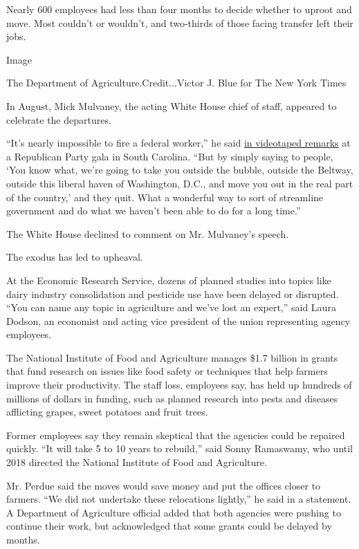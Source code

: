 Nearly 600 employees had less than four months to decide whether to
uproot and move. Most couldn't or wouldn't, and two-thirds of those
facing transfer left their jobs.

Image

The Department of Agriculture.Credit...Victor J. Blue for The New York
Times

In August, Mick Mulvaney, the acting White House chief of staff,
appeared to celebrate the departures.

``It's nearly impossible to fire a federal worker,'' he said
\href{https://www.washingtonpost.com/science/2019/08/05/usda-science-agencies-relocation-may-have-violated-law-inspector-general-report-says/}{in
videotaped remarks} at a Republican Party gala in South Carolina. ``But
by simply saying to people, `You know what, we're going to take you
outside the bubble, outside the Beltway, outside this liberal haven of
Washington, D.C., and move you out in the real part of the country,' and
they quit. What a wonderful way to sort of streamline government and do
what we haven't been able to do for a long time.''

The White House declined to comment on Mr. Mulvaney's speech.

The exodus has led to upheaval.

At the Economic Research Service, dozens of planned studies into topics
like dairy industry consolidation and pesticide use have been delayed or
disrupted. ``You can name any topic in agriculture and we've lost an
expert,'' said Laura Dodson, an economist and acting vice president of
the union representing agency employees.

The National Institute of Food and Agriculture manages \$1.7 billion in
grants that fund research on issues like food safety or techniques that
help farmers improve their productivity. The staff loss, employees say,
has held up hundreds of millions of dollars in funding, such as planned
research into pests and diseases afflicting grapes, sweet potatoes and
fruit trees.

Former employees say they remain skeptical that the agencies could be
repaired quickly. ``It will take 5 to 10 years to rebuild,'' said Sonny
Ramaswamy, who until 2018 directed the National Institute of Food and
Agriculture.

Mr. Perdue said the moves would save money and put the offices closer to
farmers. ``We did not undertake these relocations lightly,'' he said in
a statement. A Department of Agriculture official added that both
agencies were pushing to continue their work, but acknowledged that some
grants could be delayed by months.

